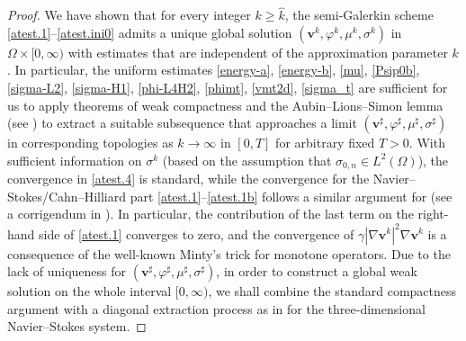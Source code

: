 \documentclass[11pt,reqno]{amsart}
\begin{document}
\begin{proof}
We have shown that for every integer $k\geq \widehat{k}$, the semi-Galerkin scheme \eqref{atest.1}--\eqref{atest.ini0} admits a unique global solution $(\bm{v}^{k},\varphi^{k},\mu^{k},\sigma^{k})$ in $\Omega \times [0,\infty)$ with estimates that are independent of the approximation parameter $k$. In particular, the uniform estimates \eqref{energy-a}, \eqref{energy-b}, \eqref{mu},
 \eqref{Psip0b}, \eqref{sigma-L2}, \eqref{sigma-H1}, \eqref{phi-L4H2}, \eqref{phimt}, \eqref{vmt2d}, \eqref{sigma_t} are sufficient for us to apply theorems of weak compactness and the Aubin--Lions--Simon lemma (see \cite{si87}) to extract a suitable subsequence that approaches a limit
$(\bm{v}^{\sharp},\varphi^{\sharp}, \mu^{\sharp}, \sigma^{\sharp})$
 in corresponding topologies as $k\to \infty$ in $[0,T]$ for arbitrary fixed $T>0$. With sufficient information on $\sigma^k$ (based on the assumption that $\sigma_{0,n}\in L^2(\Omega)$), the convergence in \eqref{atest.4} is standard, while the convergence for the Navier--Stokes/Cahn--Hilliard part \eqref{atest.1}--\eqref{atest.1b} follows a similar argument for \cite[Lemma 3]{Frigeri2016} (see a corrigendum in \cite[Remark 4.3]{Frigeri2021}).
 In particular, the contribution of the last term on the right-hand side of \eqref{atest.1} converges to zero, and the convergence of $\gamma |\nabla \bm{v}^{k}|^2\nabla \bm{v}^{k}$ is a consequence of the well-known Minty's trick for monotone operators.
 Due to the lack of uniqueness for $(\bm{v}^{\sharp},\varphi^{\sharp}, \mu^{\sharp}, \sigma^{\sharp})$, in order to construct a global weak solution on the whole interval $[0,\infty)$, we shall combine the standard compactness argument with a diagonal extraction process as in \cite[Chapter V, Section 1.3.6]{Bo13} for the three-dimensional Navier--Stokes system.


\end{proof}
\end{document}
